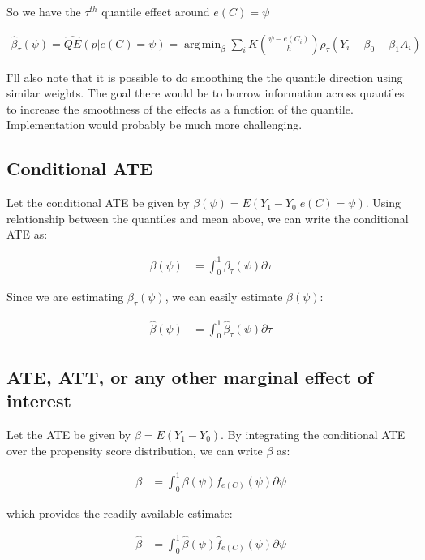 \documentclass{article}\usepackage[]{graphicx}\usepackage[]{color}
\DeclareMathOperator*{\argmin}{arg\,min}
\def\betahat{{\widehat\beta}}
\begin{document}
So we have the $\tau^{th}$ quantile effect around $e(C)=\psi$

\begin{align*}
  \betahat_\tau(\psi) = \widehat{QE}(p|e(C)=\psi) = \argmin_\beta \sum_i K\left( \frac{\psi-e(C_i)}{h}\right) \rho_\tau( Y_i - \beta_0 - \beta_1 A_i)
\end{align*}

I'll also note that it is possible to do smoothing the the quantile direction using similar weights. The goal there would be to borrow information across quantiles to increase the smoothness of the effects as a function of the quantile. Implementation would probably be much more challenging.

\subsection{Conditional ATE}

Let the conditional ATE be given by $ \beta(\psi) = E(Y_1-Y_0|e(C)=\psi)$. Using relationship between the quantiles and mean above, we can write the conditional ATE as:

\begin{align*}
   \beta(\psi) &= \int_0^1 \beta_\tau(\psi) \partial \tau
\end{align*}

Since we are estimating $\beta_\tau(\psi)$, we can easily estimate $\beta(\psi)$:

\begin{align*}
   \betahat(\psi) &= \int_0^1 \betahat_\tau(\psi) \partial \tau
\end{align*}

\subsection{ATE, ATT, or any other marginal effect of interest}

Let the ATE be given by $\beta = E(Y_1-Y_0)$. By integrating the conditional ATE over the propensity score distribution, we can write $\beta$ as:

\begin{align*}
   \beta &= \int_0^1 \beta(\psi) f_{e(C)}(\psi) \partial \psi
\end{align*}

which provides the readily available estimate:

\begin{align*}
   \widehat{\beta} &= \int_0^1 \betahat(\psi) \widehat{f}_{e(C)}(\psi) \partial \psi
\end{align*}
\end{document}
